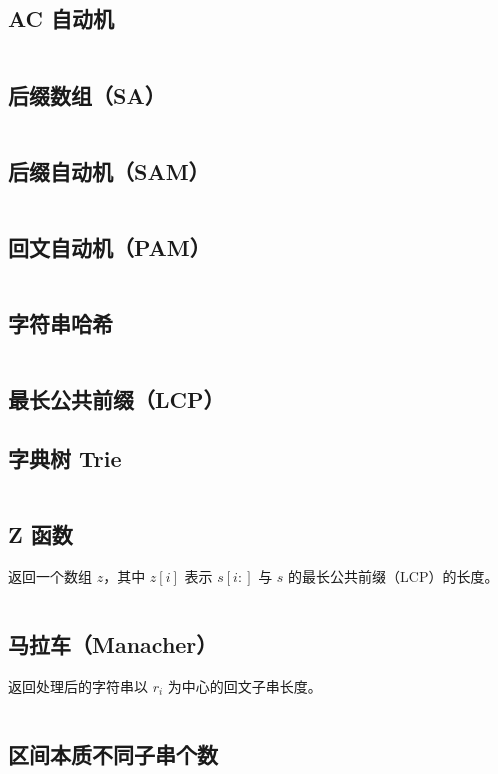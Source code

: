 \documentclass[a4paper, twoside]{article}
\begin{document}
\subsection{AC 自动机}
\inputminted{cpp}{../src/字符串/AC自动机.cpp}

\subsection{后缀数组（SA）}
\inputminted{cpp}{../src/字符串/后缀数组（SA）.cpp}

\subsection{后缀自动机（SAM）}
\inputminted{cpp}{../src/字符串/后缀自动机（SAM）.cpp}

\subsection{回文自动机（PAM）}
\inputminted{cpp}{../src/字符串/回文自动机（PAM）.cpp}

\subsection{字符串哈希}
\inputminted{cpp}{../src/字符串/字符串哈希.cpp}

\subsection{最长公共前缀（LCP）}

\subsection{字典树 Trie}
\inputminted{cpp}{../src/字符串/字典树Trie.cpp}

\subsection{Z 函数}
返回一个数组 $z$，其中 $z[i]$ 表示 $s[i:]$ 与 $s$ 的最长公共前缀（LCP）的长度。
\inputminted{cpp}{../src/字符串/Z函数.cpp}

\subsection{马拉车（Manacher）}
返回处理后的字符串以 $r_i$ 为中心的回文子串长度。
\inputminted{cpp}{../src/字符串/Manacher.cpp}

\subsection{区间本质不同子串个数}
\end{document}
